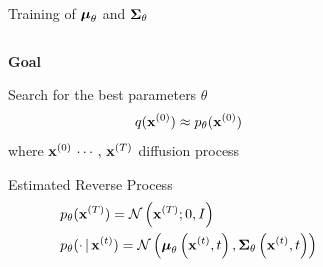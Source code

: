 \documentclass[aspectratio=169, 9pt]{beamer}
\theoremstyle{definition}
\begin{document}
\begin{frame}{Training of ${\boldsymbol{\mu}}_\theta$ and  ${\boldsymbol{\Sigma}}_\theta$}
  \begin{columns}
  \begin{column}{0.45\textwidth}
    \begin{center}
      \bf Goal
    \end{center}
    Search for the best parameters $\theta$ 
    \[
      q(\mathbf{x}^{(0)}) \approx p_\theta(\mathbf{x}^{(0)})
    \]
      where $\mathbf{x}^{(0)}\,\cdots,\,\mathbf{x}^{(T)}$ diffusion process
      \vspace{1cm}
      \begin{block}{Estimated Reverse Process}
    \[
      \begin{aligned}
        & p_\theta(\mathbf{x}^{(T)}) = \mathcal{N}\left( \mathbf{x}^{(T)}; 0, I \right)\\
        & p_\theta(\cdot\,\vert\, \mathbf{x}^{(t)})=
        \mathcal{N}\left({\boldsymbol{\mu}}_\theta\left(\mathbf{x}^{(t)},t \right),
          {\boldsymbol{\Sigma}}_\theta\left(\mathbf{x}^{(t)},t \right)\right)
      \end{aligned}
    \]
  \end{block}
  \end{column}
  \begin{column}{0.45\textwidth}
      \begin{columns}
        \begin{column}{0.45\textwidth}
        \end{column}\hspace{0.5cm}%
        \begin{column}{0.35\textwidth}

\end{column}
\end{columns}
\end{column}
\end{columns}
\end{frame}
\end{document}

